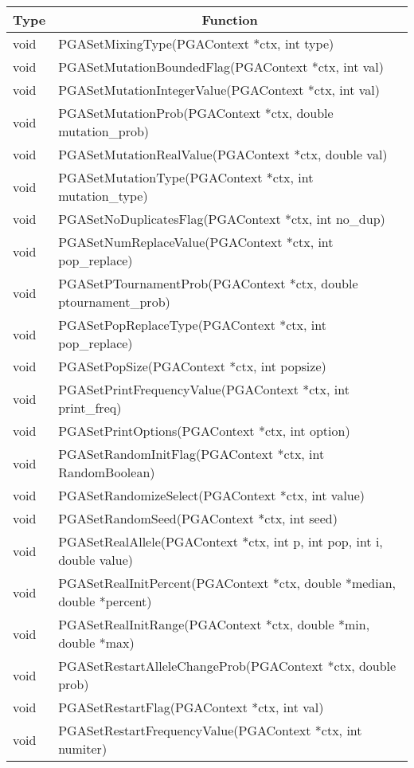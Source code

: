 \documentclass{report}
\begin{document}
\begin{tabular}{|l|l|} \hline\hline
\multicolumn{1}{|c|}{Type} &
\multicolumn{1}{c|}{Function}  \\  \hline\hline
void &  PGASetMixingType(PGAContext *ctx, int type) \\ \hline
void &  PGASetMutationBoundedFlag(PGAContext *ctx, int val) \\ \hline
void &  PGASetMutationIntegerValue(PGAContext *ctx, int val) \\ \hline
void &  PGASetMutationProb(PGAContext *ctx, double mutation\_prob) \\ \hline
void &  PGASetMutationRealValue(PGAContext *ctx, double val) \\ \hline
void &  PGASetMutationType(PGAContext *ctx, int mutation\_type) \\ \hline
void &  PGASetNoDuplicatesFlag(PGAContext *ctx, int no\_dup) \\ \hline
void &  PGASetNumReplaceValue(PGAContext *ctx, int pop\_replace) \\ \hline
void &  PGASetPTournamentProb(PGAContext *ctx, double ptournament\_prob) \\ \hline
void &  PGASetPopReplaceType(PGAContext *ctx, int pop\_replace) \\ \hline
void &  PGASetPopSize(PGAContext *ctx, int popsize) \\ \hline
void &  PGASetPrintFrequencyValue(PGAContext *ctx, int print\_freq) \\ \hline
void &  PGASetPrintOptions(PGAContext *ctx, int option) \\ \hline
void &  PGASetRandomInitFlag(PGAContext *ctx, int RandomBoolean) \\ \hline
void &  PGASetRandomizeSelect(PGAContext *ctx, int value) \\ \hline
void &  PGASetRandomSeed(PGAContext *ctx, int seed) \\ \hline
void &  PGASetRealAllele(PGAContext *ctx, int p, int pop, int i, double value)
\\ \hline
void &  PGASetRealInitPercent(PGAContext *ctx, double *median, double
*percent) \\ \hline
void &  PGASetRealInitRange(PGAContext *ctx, double *min, double *max) \\ \hline
void &  PGASetRestartAlleleChangeProb(PGAContext *ctx, double prob) \\ \hline
void &  PGASetRestartFlag(PGAContext *ctx, int val) \\ \hline
void &  PGASetRestartFrequencyValue(PGAContext *ctx, int numiter) \\ \hline

\end{tabular}
\end{document}
